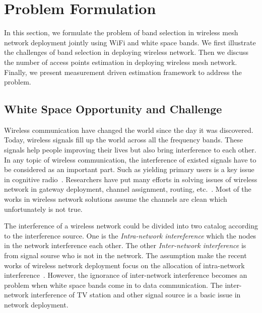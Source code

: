 \section{Problem Formulation}
\label{sec:problemformulation}

In this section, we formulate the problem of band selection in wireless 
mesh network deployment jointly using WiFi and white space bands. 
We first illustrate the challenges of band selection
in deploying wireless network. Then we discuss the number of access
 points estimation in deploying wireless mesh network. Finally, we present 
measurement driven estimation framework to address the problem. 
 
\subsection{White Space Opportunity and Challenge}
\label{subsec:motivation}
Wireless communication have changed the world since the day it was discovered.
Today, wireless signals fill up the world across all the frequency bands.
These signals help people improving their lives but also bring interference to each other.
In any topic of wireless communication, the interference of existed signals
 have to be considered as an important part.  Such as yielding primary users
is a key issue in cognitive radio~\cite{haykin2005cognitive}. Researchers have 
put many efforts in solving issues of wireless network in gateway deployment, channel 
assignment, routing, etc.~\cite{he2008optimizing,tang2005interference}.
Most of the works in wireless network solutions assume the channels are clean 
which unfortunately is not true.

The interference of a wireless network could be divided into two catalog according
 to the interference source.
 One is the {\it Intra-network intereference} which the nodes in the 
network interference each other. The other {\it Inter-network interference}
 is from signal sourse who is not in the network. 
The assumption make the recent works of wireless 
network deployment focus on the allocation of intra-network interference~\cite{si2010overview}. 
However, the ignorance of inter-network interference becomes an problem when 
white space bands come in to data communication. The inter-network 
interference of TV station and other signal source is a basic issue in network
deployment.

